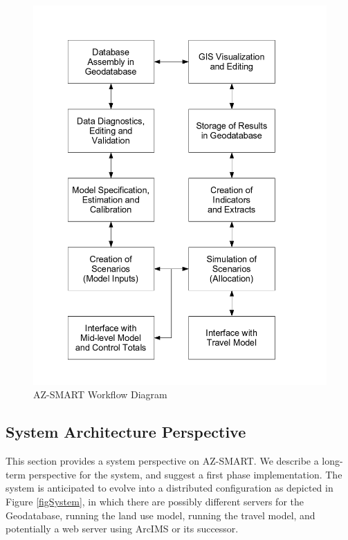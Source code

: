 \documentclass[titlepage]{article}
\begin{document}
\begin{figure}[h]
\begin{center}
\includegraphics[scale=0.5]{figures/functional_diagram.png}
\caption{AZ-SMART Workflow Diagram}
\label{figWorkflow}
\end{center}
\end{figure}

\subsection{System Architecture Perspective}
This section provides a system perspective on AZ-SMART.  We describe a long-term perspective for the system, and suggest a first phase implementation.  The system is anticipated to evolve into a distributed configuration as depicted in Figure \ref{figSystem}, in which there are possibly different servers for the Geodatabase, running the land use model, running the travel model, and potentially a web server using ArcIMS or its successor.
\end{document}
